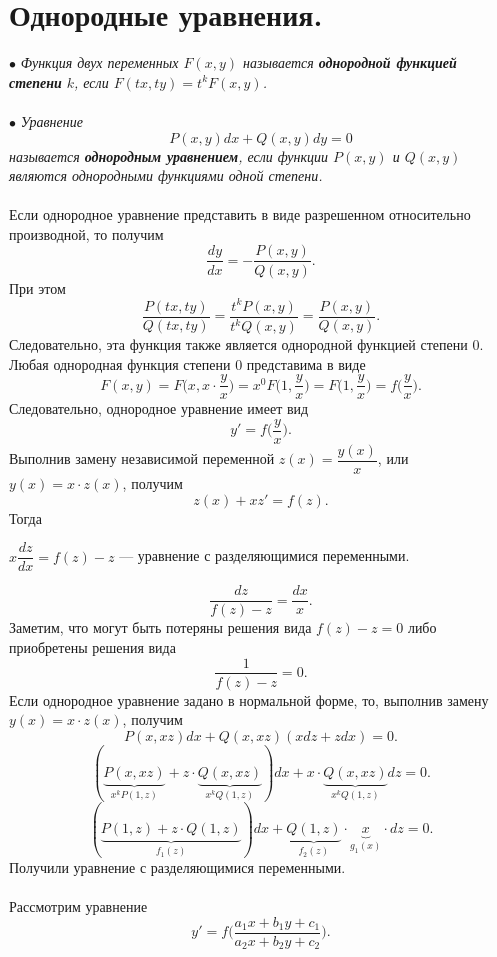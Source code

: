 \documentclass[a4paper, 12pt]{report}
\begin{document}
\section{Однородные уравнения.}
	$\bullet$ \textit{Функция двух переменных $F(x,y)$ называется \textbf{однородной функцией степени} $k$, если $F(tx,ty) = t^kF(x,y)$.}\\\\
	$\bullet$ \textit{Уравнение $$P(x,y)dx + Q(x,y)dy = 0$$ называется \textbf{однородным уравнением}, если функции $P(x,y)$ и $Q(x,y)$ являются однородными функциями одной степени.}\\\\
	Если однородное уравнение представить в виде разрешенном относительно производной, то получим $$\dfrac{dy}{dx} = -\dfrac{P(x,y)}{Q(x,y)}.$$
	При этом $$\dfrac{P(tx,ty)}{Q(tx,ty)} = \dfrac{t^kP(x,y)}{t^kQ(x,y)} = \dfrac{P(x,y)}{Q(x,y)}.$$
	Следовательно, эта функция также является однородной функцией степени 0. Любая однородная функция степени 0 представима в виде $$F(x,y) = F\Big(x,x\cdot \dfrac{y}{x}\Big) = x^0F\Big(1, \dfrac{y}{x}\Big) =F\Big(1,\dfrac{y}{x}\Big) = f\Big(\dfrac{y}{x}\Big).$$
	Следовательно, однородное уравнение имеет вид $$y' = f\Big(\dfrac{y}{x}\Big).$$
	Выполнив замену независимой переменной $z(x) = \dfrac{y(x)}{x}$, или $y(x) = x\cdot z(x)$, получим $$z(x) + xz' = f(z).$$
	Тогда \begin{center}
		$x\dfrac{dz}{dx} = f(z) - z$ --- уравнение с разделяющимися переменными.
	\end{center}
	$$\dfrac{dz}{f(z) - z} = \dfrac{dx}{x}.$$
	Заметим, что могут быть потеряны решения вида $f(z) - z = 0$ либо приобретены решения вида $$\dfrac{1}{f(z) - z} = 0.$$
	Если однородное уравнение задано в нормальной форме, то, выполнив замену $y(x) = x\cdot z(x)$, получим $$P(x,xz)dx + Q(x,xz) (xdz + zdx) = 0.$$
	$$(\underbrace{P(x,xz)}_{x^kP(1,z)} + z\cdot \underbrace{Q(x,xz)}_{x^kQ(1,z)})dx +x\cdot  \underbrace{Q(x,xz)}_{x^kQ(1,z)}dz = 0.$$
	$$(\underbrace{P(1,z) + z\cdot Q(1,z)}_{f_1(z)})dx + \underbrace{Q(1,z)}_{f_2(z)}\cdot \underbrace{x}_{g_1(x)}\cdot dz = 0.$$
	Получили уравнение с разделяющимися переменными.\\\\
Рассмотрим уравнение  $$y' = f\Big(\dfrac{a_1x + b_1y + c_1}{a_2 x + b_2y + c_2}\Big).$$
\end{document}
